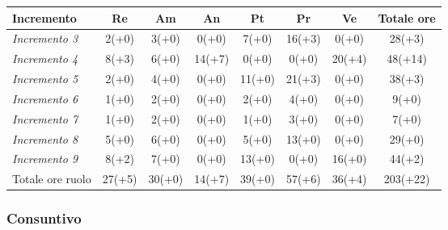 {{{{{{{{{	\begin{center}
		\renewcommand{\arraystretch}{1.4}
		\begin{tabularx}{\textwidth}{|X|c|c|c|c|c|c|c|}
			\hline
			\rowcolor{airforceblue}
			\textbf{Incremento} & \textbf{Re} & \textbf{Am} & \textbf{An} & \textbf{Pt} & \textbf{Pr} & \textbf{Ve} & \textbf{Totale ore}\\
			\hline
			\textit{Incremento 3} & 2(+0) & 3(+0) & 0(+0) & 7(+0) & 16(+3) & 0(+0) & 28(+3)\\
			\hline
			\textit{Incremento 4} & 8(+3) & 6(+0) & 14(+7) & 0(+0) & 0(+0) & 20(+4) & 48(+14) \\
			\hline
			\textit{Incremento 5} & 2(+0) & 4(+0) & 0(+0) & 11(+0) & 21(+3) & 0(+0) & 38(+3)\\
			\hline
			\textit{Incremento 6} & 1(+0) & 2(+0) & 0(+0) & 2(+0) & 4(+0) & 0(+0) & 9(+0)\\
			\hline
			\textit{Incremento 7} & 1(+0) & 2(+0) & 0(+0) & 1(+0) & 3(+0) & 0(+0) & 7(+0)\\
			\hline
			\textit{Incremento 8} & 5(+0) & 6(+0) & 0(+0) & 5(+0) & 13(+0) & 0(+0) & 29(+0)\\
			\hline
			\textit{Incremento 9} & 8(+2) & 7(+0) & 0(+0) & 13(+0) & 0(+0) & 16(+0) & 44(+2)\\
			\hline
			Totale ore ruolo & 27(+5) & 30(+0) & 14(+7) & 39(+0) & 57(+6) & 36(+4) & 203(+22)\\
			\hline
		\end{tabularx}
	\end{center}

\subsubsection{Consuntivo}\label{ConsuntivoSecondoPeriodoDiProgettazioneDiDettaglioCodificaIncrementiCosto}

}}}}}}}}}
